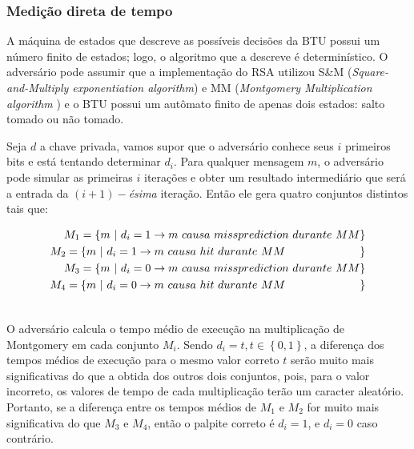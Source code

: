 \subsubsection{Medi\c{c}\~{a}o direta de tempo}

A m\'{a}quina de estados que descreve as poss\'{i}veis decis\~{o}es da BTU possui um n\'{u}mero finito de estados; logo, o algoritmo que a descreve \'{e} determin\'{i}stico. O advers\'{a}rio pode assumir que a implementa\c{c}\~{a}o do RSA utilizou S\&M (\textit{Square-and-Multiply exponentiation algorithm}) e MM (\textit{Montgomery Multiplication algorithm} \cite{ECCBook_HankersonVanstone2004, 1197338}) e o BTU possui um aut\^{o}mato finito de apenas dois estados: salto tomado ou n\~{a}o tomado.

Seja $d$ a chave privada, vamos supor que o advers\'{a}rio conhece seus $i$ primeiros bits e est\'{a} tentando determinar $d_{i}$. Para qualquer mensagem $m$, o advers\'{a}rio pode simular as primeiras $i$ itera\c{c}\~{o}es e obter um resultado intermedi\'{a}rio que ser\'{a} a entrada da $(i+1)-$\textit{\'{e}sima} itera\c{c}\~{a}o. Ent\~{a}o ele gera quatro conjuntos distintos tais que:

\begin{align} \notag
	M_{1} = \left\lbrace m\ \vert\ d_{i} = 1 \rightarrow m\ causa\ missprediction\ durante\ MM\right\rbrace \\ \notag
	M_{2} = \left\lbrace m\ \vert\ d_{i} = 1 \rightarrow m\ causa\ hit\ durante\ MM\ \ \ \ \ \ \ \ \ \ \ \ \ \ \ \ \ \ \ \ \right\rbrace \\ \notag
	M_{3} = \left\lbrace m\ \vert\ d_{i} = 0 \rightarrow m\ causa\ missprediction\ durante\ MM\right\rbrace \\ \notag
	M_{4} = \left\lbrace m\ \vert\ d_{i} = 0 \rightarrow m\ causa\ hit\ durante\ MM\ \ \ \ \ \ \ \ \ \ \ \ \ \ \ \ \ \ \ \ \right\rbrace \\ \notag
\end{align}

O advers\'{a}rio calcula o tempo m\'{e}dio de execu\c{c}\~{a}o na multiplica\c{c}\~{a}o de Montgomery em cada conjunto $M_{i}$. Sendo $d_{i} = t, t \in \left\lbrace 0,1\right\rbrace $, a diferen\c{c}a dos tempos m\'{e}dios de execu\c{c}\~{a}o para o mesmo valor correto $t$ ser\~{a}o muito mais significativas do que a obtida dos outros dois conjuntos, pois, para o valor incorreto, os valores de tempo de cada multiplica\c{c}\~{a}o ter\~{a}o um caracter aleat\'{o}rio. Portanto, se a diferen\c{c}a entre os tempos m\'{e}dios de $M_{1}$ e $M_{2}$ for muito mais significativa do que $M_{3}$ e $M_{4}$, ent\~{a}o o palpite correto \'{e} $d_{i} = 1$, e $d_{i} = 0$ caso contr\'{a}rio. 


